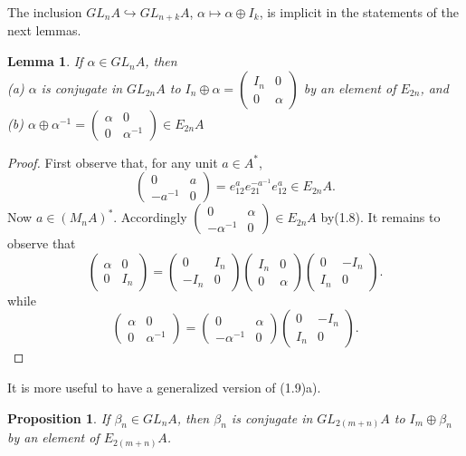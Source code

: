 \documentclass[openany,leqno]{book}  %
\newtheorem{lemma}[theorem]{Lemma}
\newtheorem{prop}[theorem]{Proposition}
\begin{document}
The inclusion $GL_nA\hookrightarrow GL_{n+k}A$, $\alpha\mapsto \alpha\oplus I_k$, is implicit in the statements of the next lemmas.
\begin{lemma}
If $\alpha \in GL_nA$, then\\
(a) $\alpha$ is conjugate in $GL_{2n}A$ to $I_n\oplus \alpha=\begin{pmatrix} I_n & 0 \\ 0 &  \alpha \end{pmatrix}$ by an element of $E_{2n}$, and\\
(b) $\alpha\oplus \alpha^{-1}=\begin{pmatrix} \alpha & 0 \\ 0 &  \alpha^{-1} \end{pmatrix}\in E_{2n}A$
\end{lemma}
\begin{proof}
First observe that, for any unit $a\in A^*$,
\[\begin{pmatrix} 0 & a \\ -a^{-1} &  0 \end{pmatrix}=e_{12}^ae_{21}^{-a^{-1}}e_{12}^{a}\in E_{2n} A.\]
Now $a\in (M_nA)^*$. Accordingly $\begin{pmatrix} 0 & \alpha \\ -\alpha^{-1} &  0 \end{pmatrix}\in E_{2n}A$ by(1.8). It remains to observe that
\[\begin{pmatrix} \alpha &  0\\ 0 &  I_n\end{pmatrix}=\begin{pmatrix} 0 & I_n \\ -I_n &  0 \end{pmatrix}\begin{pmatrix}  I_n&  0\\ 0 & \alpha \end{pmatrix}\begin{pmatrix} 0 & -I_n \\ I_n &  0 \end{pmatrix}.\]
while
\[\begin{pmatrix} \alpha & 0 \\ 0 &  \alpha^{-1} \end{pmatrix}=\begin{pmatrix} 0 & \alpha \\ -\alpha^{-1} &  0 \end{pmatrix}\begin{pmatrix} 0 & -I_n \\ I_n &  0 \end{pmatrix}.\]
\end{proof}
It is more useful to have a generalized version of (1.9)a).
\begin{prop}
If $\beta_n\in GL_nA$, then $\beta_n$ is conjugate in $GL_{2(m+n)}A$ to $I_m\oplus \beta_n$ by an element of
$E_{2(m+n)}A$.
\end{prop}
\end{document}
